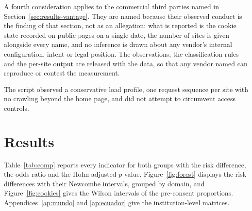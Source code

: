 \documentclass[pdflatex,sn-basic,Numbered,iicol]{sn-jnl}
\theoremstyle{thmstyleone}
\theoremstyle{thmstyletwo}
\theoremstyle{thmstylethree}
\begin{document}
A fourth consideration applies to the commercial third parties named in Section~\ref{sec:results-vantage}. They are named because their observed conduct is the finding of that section, not as an allegation: what is reported is the cookie state recorded on public pages on a single date, the number of sites is given alongside every name, and no inference is drawn about any vendor's internal configuration, intent or legal position. The observations, the classification rules and the per-site output are released with the data, so that any vendor named can reproduce or contest the measurement.

The script observed a conservative load profile, one request sequence per site with no crawling beyond the home page, and did not attempt to circumvent access controls.

\section{Results}\label{sec:results}

Table~\ref{tab:comp} reports every indicator for both groups with the risk difference, the odds ratio and the Holm-adjusted $p$ value. Figure~\ref{fig:forest} displays the risk differences with their Newcombe intervals, grouped by domain, and Figure~\ref{fig:cookies} gives the Wilson intervals of the pre-consent proportions. Appendices~\ref{ap:mundo} and \ref{ap:ecuador} give the institution-level matrices.
\end{document}
